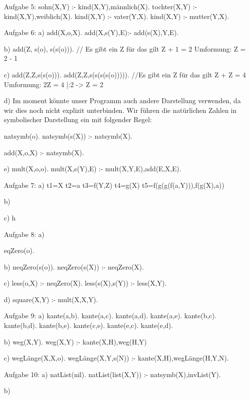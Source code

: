 Aufgabe 5:
sohn(X,Y) :- kind(X,Y),männlich(X).
tochter(X,Y) :- kind(X,Y),weiblich(X).
kind(X,Y) :- vater(Y,X).
kind(X,Y) :- mutter(Y,X).

Aufgabe 6:
a)
add(X,o,X).
add(X,s(Y),E):- add(s(X),Y,E).

b)
add(Z, s(o), s(s(o))). // Es gibt ein Z für das gilt Z + 1 = 2 Umformung: Z = 2 - 1

c)
add(Z,Z,s(s(o))).
add(Z,Z,s(s(s(s(o))))). //Es gibt ein Z für das gilt Z + Z = 4 Umformung: 2Z = 4 |:2 -> Z = 2

d)
Im moment könnte unser Programm auch andere Darstellung verwenden, da wir dies noch nicht explizit unterbinden.
Wir führen die natürlichen Zahlen in symbolischer Darstellung ein mit folgender Regel:

natsymb(o).
natsymb(s(X)) :- natsymb(X).

add(X,o,X) :- natsymb(X).

e)
mult(X,o,o).
mult(X,s(Y),E) :- mult(X,Y,E),add(E,X,E).

Aufgabe 7:
a)
t1=X t2=a t3=f(Y,Z) t4=g(X) t5=f(g(g(f(a,Y))),f(g(X),a))

b)

c)
h


Aufgabe 8:
a)

eqZero(o).

b)
neqZero(s(o)).
neqZero(s(X)) :-  neqZero(X).

c)
less(o,X) :- neqZero(X).
less(s(X),s(Y)) :- less(X,Y).

d)
square(X,Y) :- mult(X,X,Y).


Aufgabe 9:
a)
kante(a,b).
kante(a,c).
kante(a,d).
kante(a,e).
kante(b,c).
kante(b,d).
kante(b,e).
kante(c,e).
kante(e,c).
kante(e,d).
 
b)
weg(X,Y).
weg(X,Y) :- kante(X,H),weg(H,Y)

c)
wegLänge(X,X,o).
wegLänge(X,Y,s(N)) :- kante(X,H),wegLänge(H,Y,N).


Aufgabe 10:
a)
natList(nil).
natList(list(X,Y)) :- natsymb(X),invList(Y).

b)
